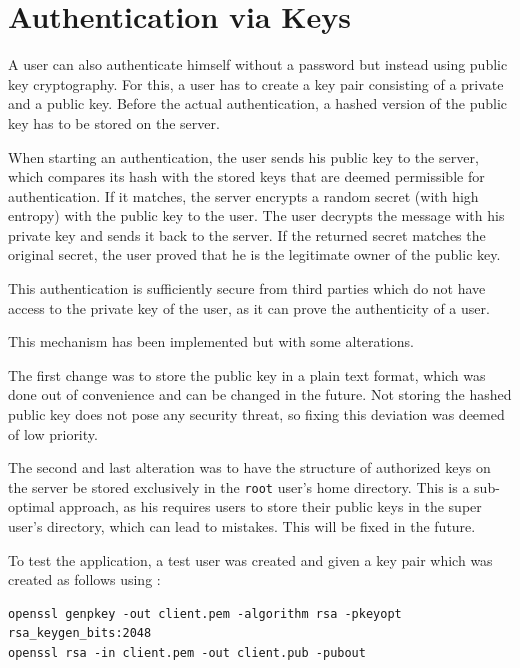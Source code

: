\documentclass[10pt,a4paper,titlepage,twoside,english,final]{zhawreprt}
\begin{document}
\section{Authentication via Keys}\label{sec:ImplAuthViaKeys}
A user can also authenticate himself without a password but instead using public key cryptography.
For this, a user has to create a key pair consisting of a private and a public key.
Before the actual authentication, a hashed version of the public key has to be stored on the server.

When starting an authentication, the user sends his public key to the server, which compares its hash with the stored keys that are deemed permissible for authentication.
If it matches, the server encrypts a random secret (with high entropy) with the public key to the user.
The user decrypts the message with his private key and sends it back to the server.
If the returned secret matches the original secret, the user proved that he is the legitimate owner of the public key.

This authentication is sufficiently secure from third parties which do not have access to the private key of the user, as it can prove the authenticity of a user.

This mechanism has been implemented but with some alterations.

The first change was to store the public key in a plain text format, which was done out of convenience and can be changed in the future.
Not storing the hashed public key does not pose any security threat, so fixing this deviation was deemed of low priority.

The second and last alteration was to have the structure of authorized keys on the server be stored exclusively in the \texttt{root} user's home directory.
This is a sub-optimal approach, as his requires users to store their public keys in the super user's directory, which can lead to mistakes.
This will be fixed in the future.

To test the application, a test user was created and given a key pair which was created as follows using \cite{openssl}:

\setlistingBash
\begin{lstlisting}[caption={Generating a key pair for the client},label=lst:GenClientKeyPair,deletekeywords={in}]
openssl genpkey -out client.pem -algorithm rsa -pkeyopt rsa_keygen_bits:2048
openssl rsa -in client.pem -out client.pub -pubout
\end{lstlisting}
\end{document}

